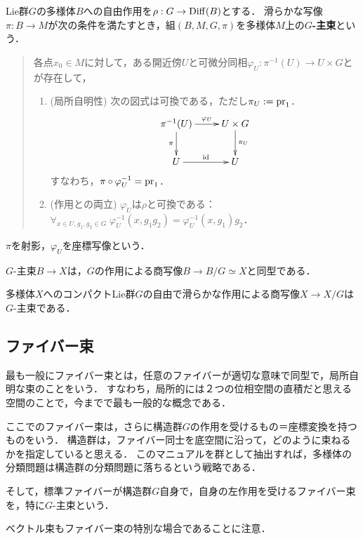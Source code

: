 \documentclass[uplatex,dvipdfmx]{jsreport}
\begin{document}
\begin{definition}
    Lie群$G$の多様体$B$への自由作用を$\rho:G\to\mathrm{Diff}(B)$とする．
    滑らかな写像$\pi:B\to M$が次の条件を満たすとき，組$(B,M,G,\pi)$を多様体$M$上の\textbf{$G$-主束}という．
    \begin{quote}
        各点$x_0\in M$に対して，ある開近傍$U$と可微分同相$\varphi_U:\pi^{-1}(U)\to U\times G$とが存在して，
        \begin{enumerate}
            \item (局所自明性) 次の図式は可換である，ただし$\pi_U:=\mathrm{pr}_1$．
            \[\xymatrix{
                \pi^{-1}(U)\ar[r]^-{\varphi_U}\ar[d]_-{\pi}&U\times G\ar[d]^-{\pi_U}\\
                U\ar[r]^-\id&U
            }\]
            すなわち，$\pi\circ\varphi_U^{-1}=\mathrm{pr}_1$．
            \item (作用との両立) $\varphi_U$は$\rho$と可換である：$\forall_{x\in U,g_1,g_2\in G}\;\varphi_U^{-1}(x,g_1g_2)=\varphi_U^{-1}(x,g_1)g_2$．
        \end{enumerate}
    \end{quote}
    $\pi$を射影，$\varphi_U$を座標写像という．
\end{definition}

\begin{proposition}
    $G$-主束$B\to X$は，$G$の作用による商写像$B\to B/G\simeq X$と同型である．
\end{proposition}

\begin{proposition}
    多様体$X$へのコンパクトLie群$G$の自由で滑らかな作用による商写像$X\to X/G$は$G$-主束である．
\end{proposition}

\subsection{ファイバー束}

\begin{tcolorbox}[colframe=ForestGreen, colback=ForestGreen!10!white,breakable,colbacktitle=ForestGreen!40!white,coltitle=black,fonttitle=\bfseries\sffamily,
title=]
    最も一般にファイバー束とは，任意のファイバーが適切な意味で同型で，局所自明な束のことをいう．
    すなわち，局所的には２つの位相空間の直積だと思える空間のことで，今までで最も一般的な概念である．

    ここでのファイバー束は，さらに構造群$G$の作用を受けるもの＝座標変換を持つものをいう．
    構造群は，ファイバー同士を底空間に沿って，どのように束ねるかを指定していると思える．
    このマニュアルを群として抽出すれば，多様体の分類問題は構造群の分類問題に落ちるという戦略である．

    そして，標準ファイバーが構造群$G$自身で，自身の左作用を受けるファイバー束を，特に$G$-主束という．

    ベクトル束もファイバー束の特別な場合であることに注意．
\end{tcolorbox}
\end{document}
